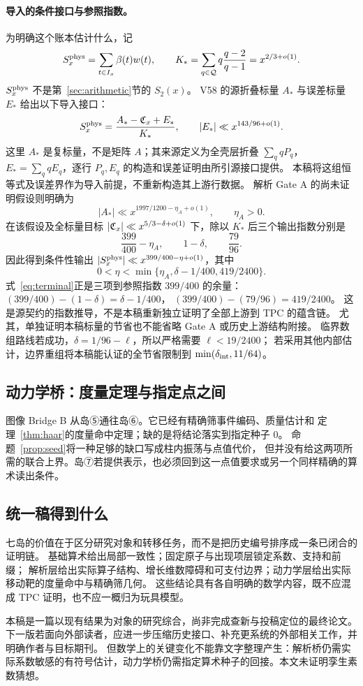 \paragraph{导入的条件接口与参照指数。}
为明确这个账本估计什么，记
\[
S_x^{\rm phys}=\sum_{t\in I_x}\beta(t)w(t),\qquad
K_* =\sum_{q\in\mathcal Q}q\frac{q-2}{q-1}=x^{2/3+o(1)}.
\]
$S_x^{\rm phys}$ 不是第~\ref{sec:arithmetic}节的 $S_2(x)$。
V58 的源折叠标量 $A_*$ 与误差标量 $E_*$ 给出以下导入接口\cite{archivev58}：
\[
S_x^{\rm phys}=\frac{A_*-\mathfrak C_x+E_*}{K_*},\qquad
|E_*|\ll x^{143/96+o(1)}.
\]
这里 $A_*$ 是复标量，不是矩阵 $A$；其来源定义为全壳层折叠 $\sum_q qP_q$，
$E_*=\sum_q qE_q$，逐行 $P_q,E_q$ 的构造和误差证明由所引源接口提供。
本稿将这组恒等式及误差界作为导入前提，不重新构造其上游行数据。
解析 Gate A 的尚未证明假设则明确为
\[
|A_*|\ll x^{1997/1200-\eta_A+o(1)},\qquad \eta_A>0.
\]
在该假设及全标量目标 $|\mathfrak C_x|\ll x^{5/3-\delta+o(1)}$ 下，除以 $K_*$ 后三个输出指数分别是
\[
\frac{399}{400}-\eta_A,\qquad 1-\delta,\qquad \frac{79}{96}.
\]
因此得到条件性输出 $|S_x^{\rm phys}|\ll x^{399/400-\eta+o(1)}$，其中
\begin{equation}
0<\eta<\min\{\eta_A,\delta-1/400,419/2400\}.\label{eq:terminal}
\end{equation}
式~\eqref{eq:terminal}正是三项到参照指数 $399/400$ 的余量：
$(399/400)-(1-\delta)=\delta-1/400$，
$(399/400)-(79/96)=419/2400$。
这是源契约的指数推导\cite{archivev58,archivev59,archivephysical}，不是本稿重新独立证明了全部上游到 TPC 的蕴含链。
尤其，单独证明本稿标量的节省也不能省略 Gate A 或历史上游结构附接。
临界数组路线若成功，$\delta=1/96-\ell$，所以严格需要 $\ell<19/2400$；
若采用其他内部估计，边界重组将本稿能认证的全节省限制到 $\min(\delta_{\rm int},11/64)$。

\subsection{动力学桥：度量定理与指定点之间}
图像 Bridge B 从岛⑤通往岛⑥。它已经有精确筛事件编码、质量估计和
定理~\ref{thm:haar}的度量命中定理；缺的是将结论落实到指定种子 $0$。
命题~\ref{prop:seed}将一种足够的缺口写成柱内振荡与点值代价，
但并没有给这两项所需的联合上界。岛⑦若提供表示，也必须回到这一点值要求或另一个同样精确的算术读出条件。

\subsection{统一稿得到什么}
七岛的价值在于区分研究对象和转移任务，而不是把历史编号排序成一条已闭合的证明链。
基础算术给出局部一致性；固定原子与出现项层锁定系数、支持和前缀；
解析层给出实际算子结构、增长维数障碍和可支付边界；动力学层给出实际移动靶的度量命中与精确筛几何。
这些结论具有各自明确的数学内容，既不应混成 TPC 证明，也不应一概归为玩具模型。

本稿是一篇以现有结果为对象的研究综合，尚非完成查新与投稿定位的最终论文。
下一版若面向外部读者，应进一步压缩历史接口、补充更系统的外部相关工作，并明确作者与目标期刊。
但数学上的关键变化不能靠文字整理产生：解析桥仍需实际系数敏感的有符号估计，动力学桥仍需指定算术种子的回接。本文未证明孪生素数猜想。
